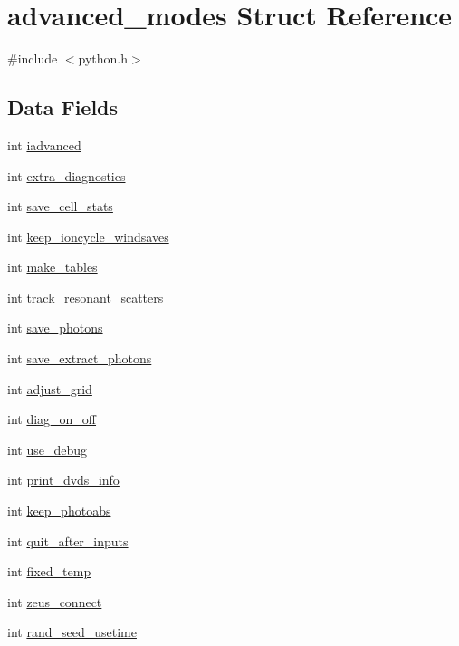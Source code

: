 \hypertarget{structadvanced__modes}{}\section{advanced\+\_\+modes Struct Reference}
\label{structadvanced__modes}


{\ttfamily \#include $<$python.\+h$>$}

\subsection*{Data Fields}
\begin{DoxyCompactItemize}
\item 
int \hyperlink{structadvanced__modes_af01ce2e0a78e9f6f5bf1ef516626996f}{iadvanced}
\item 
int \hyperlink{structadvanced__modes_af1e206518e9a1375ec7eaf46987027a3}{extra\+\_\+diagnostics}
\item 
int \hyperlink{structadvanced__modes_a1322d2fb212a058161983a48ef285fab}{save\+\_\+cell\+\_\+stats}
\item 
int \hyperlink{structadvanced__modes_aec6e4133d1409070e2add4ec7f619168}{keep\+\_\+ioncycle\+\_\+windsaves}
\item 
int \hyperlink{structadvanced__modes_aaf94bf2761fb596aefe7d1e9b6fb20dc}{make\+\_\+tables}
\item 
int \hyperlink{structadvanced__modes_af518e12ae42b1bdfb7de2660adb40750}{track\+\_\+resonant\+\_\+scatters}
\item 
int \hyperlink{structadvanced__modes_a41c707d32842f1fac96e4dbe16d60c48}{save\+\_\+photons}
\item 
int \hyperlink{structadvanced__modes_a5d9283715561297f40d4ece6e7cd4c4f}{save\+\_\+extract\+\_\+photons}
\item 
int \hyperlink{structadvanced__modes_af1940e04af66a0c74cc4bde338236b54}{adjust\+\_\+grid}
\item 
int \hyperlink{structadvanced__modes_a1b1488c202da4f2131eb2800e10ed2a1}{diag\+\_\+on\+\_\+off}
\item 
int \hyperlink{structadvanced__modes_a2a2099f7722b2b148e53d0d6aca63f26}{use\+\_\+debug}
\item 
int \hyperlink{structadvanced__modes_a5c4b03b07f56d7085f202d23a7925ed1}{print\+\_\+dvds\+\_\+info}
\item 
int \hyperlink{structadvanced__modes_a067fe29b52bdeb7a6f9efa1019e418f1}{keep\+\_\+photoabs}
\item 
int \hyperlink{structadvanced__modes_a77fab35698c16498dee21a41813c9811}{quit\+\_\+after\+\_\+inputs}
\item 
int \hyperlink{structadvanced__modes_aad0ff1589062988053354087930055bb}{fixed\+\_\+temp}
\item 
int \hyperlink{structadvanced__modes_a9a1d48d878cdb6a4ef9c0f08f3f42f12}{zeus\+\_\+connect}
\item 
int \hyperlink{structadvanced__modes_a4da5e005fe696de0f87e747fa7fb302c}{rand\+\_\+seed\+\_\+usetime}
\end{DoxyCompactItemize}


